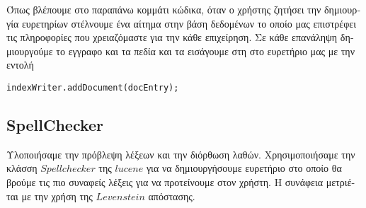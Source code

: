 \textgreek{
Όπως βλέπουμε στο παραπάνω κομμάτι κώδικα, όταν ο χρήστης ζητήσει την δημιουργία ευρετηρίων στέλνουμε ένα αίτημα
στην βάση δεδομένων το οποίο μας επιστρέφει τις πληροφορίες που χρειαζόμαστε για την κάθε επιχείρηση. Σε κάθε επανάληψη
δημιουργούμε το εγγραφο και τα πεδία και τα εισάγουμε στη στο ευρετήριο μας με την εντολή
}
\lstset{style=secondStyle}
\begin{lstlisting}
indexWriter.addDocument(docEntry);
\end{lstlisting}

\subsection{SpellChecker}
\textgreek{
Υλοποιήσαμε την πρόβλεψη λέξεων και την διόρθωση λαθών. Χρησιμοποιήσαμε την κλάσση $Spellchecker$ της $lucene$ για να
δημιουργήσουμε ευρετήριο στο οποίο θα βρούμε τις πιο συναφείς λέξεις για να προτείνουμε στον χρήστη. Η συνάφεια
μετριέται με την χρήση της $Levenstein$ απόστασης.
}
\lstset{style=mystyle}
\begin{lstlisting}

\end{lstlisting}
